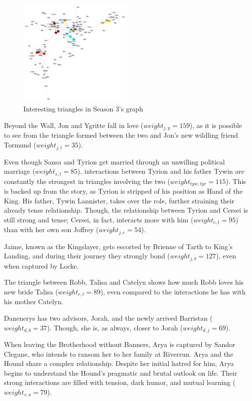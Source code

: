 \documentclass[10pt,twocolumn,letterpaper]{article}
\begin{document}
\begin{figure}[!h]
    \centering
    \includegraphics[width=0.5\textwidth]{img/s3/interesting_triangles.jpg}
    \caption{\small{Interesting triangles in Season 3's graph}}
    \label{fig:tr_s3}
\end{figure}

Beyond the Wall, Jon and Ygritte fall in love ($weight_{j,y}=159$), as it is possible to see from the triangle formed between the two and Jon's new wildling friend Tormund ($weight_{j,t}=35$). 

Even though Sansa and Tyrion get married through an unwilling political marriage ($weight_{s,t}=85$), interactions between Tyrion and his father Tywin are constantly the strongest in triangles involving the two ($weight_{tyw,tyr}=115$). This is backed up from the story, as Tyrion is stripped of his position as Hand of the King. His father, Tywin Lannister, takes over the role, further straining their already tense relationship. Though, the relationship between Tyrion and Cersei is still strong and tense; Cersei, in fact, interacts more with him ($weight_{c,t}=95$) than with her own son Joffrey ($weight_{j,c}=54$). 

Jaime, known as the Kingslayer, gets escorted by Brienne of Tarth to King's Landing, and during their journey they strongly bond ($weight_{j,b}=127$), even when captured by Locke. 

The triangle between Robb, Talisa and Catelyn shows how much Robb loves his new bride Talisa ($weight_{r,t}=89$), even compared to the interactions he has with his mother Catelyn. 

Danenerys has two advisors, Jorah, and the newly arrived Barristan ($weight_{d,b}=37$). Though, she is, as always, closer to Jorah ($weight_{d,j}=69$).

When leaving the Brotherhood without Banners, Arya is captured by Sandor Clegane, who intends to ransom her to her family at Riverrun. Arya and the Hound share a complex relationship. Despite her initial hatred for him, Arya begins to understand the Hound's pragmatic and brutal outlook on life. Their strong interactions are filled with tension, dark humor, and mutual learning ($weight_{s,a}=79$).
\end{document}
